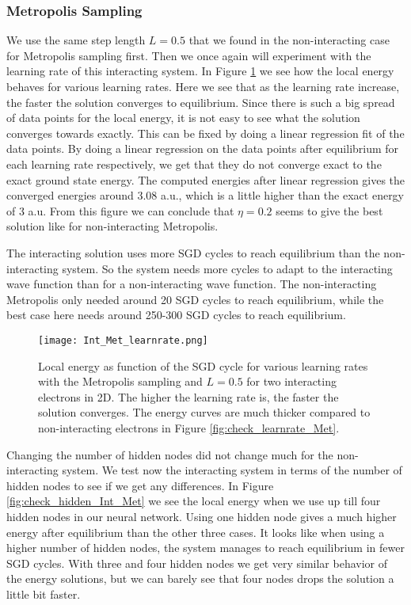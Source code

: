 \documentclass[12pt,a4paper,english]{article}
\begin{document}
\subsubsection{Metropolis Sampling}
\label{subsubsect:Results_int_Metropolis}
We use the same step length $L=0.5$ that we found in the non-interacting case for Metropolis sampling first. Then we once again will experiment with the learning rate of this interacting system. In Figure \ref{fig:check_learnrate_Int_Met} we see how the local energy behaves for various learning rates. Here we see that as the learning rate increase, the faster the solution converges to equilibrium. Since there is such a big spread of data points for the local energy, it is not easy to see what the solution converges towards exactly. This can be fixed by doing a linear regression fit of the data points. By doing a linear regression on the data points after equilibrium for each learning rate respectively, we get that they do not converge exact to the exact ground state energy. The computed energies after linear regression gives the converged energies around 3.08 a.u., which is a little higher than the exact energy of 3 a.u. From this figure we can conclude that $\eta=0.2$ seems to give the best solution like for non-interacting Metropolis.

The interacting solution uses more SGD cycles to reach equilibrium than the non-interacting system. So the system needs more cycles to adapt to the interacting wave function than for a non-interacting wave function. The non-interacting Metropolis only needed around 20 SGD cycles to reach equilibrium, while the best case here needs around 250-300 SGD cycles to reach equilibrium.

\begin{figure}[ht!]
	\centering\texttt{[image: Int\_Met\_learnrate.png]}
	\caption{Local energy as function of the SGD cycle for various learning rates with the Metropolis sampling and $L=0.5$ for two interacting electrons in 2D. The higher the learning rate is, the faster the solution converges. The energy curves are much thicker compared to non-interacting electrons in Figure \ref{fig:check_learnrate_Met}. \label{fig:check_learnrate_Int_Met}}
\end{figure} 

\newpage
Changing the number of hidden nodes did not change much for the non-interacting system. We test now the interacting system in terms of the number of hidden nodes to see if we get any differences. In Figure 
\ref{fig:check_hidden_Int_Met} we see the local energy when we use up till four hidden nodes in our neural network. Using one hidden node gives a much higher energy after equilibrium than the other three cases. It looks like when using a higher number of hidden nodes, the system manages to reach equilibrium in fewer SGD cycles. With three and four hidden nodes we get very similar behavior of the energy solutions, but we can barely see that four nodes drops the solution a little bit faster.
\end{document}
